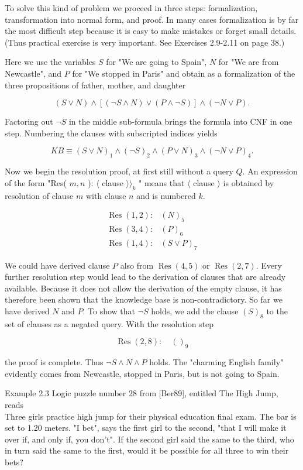 \documentclass[10pt]{article}
\begin{document}
To solve this kind of problem we proceed in three steps: formalization, transformation into normal form, and proof. In many cases formalization is by far the most difficult step because it is easy to make mistakes or forget small details. (Thus practical exercise is very important. See Exercises 2.9-2.11 on page 38.)

Here we use the variables $S$ for "We are going to Spain", $N$ for "We are from Newcastle", and $P$ for "We stopped in Paris" and obtain as a formalization of the three propositions of father, mother, and daughter

$$
(S \vee N) \wedge[(\neg S \wedge N) \vee(P \wedge \neg S)] \wedge(\neg N \vee P) .
$$

Factoring out $\neg S$ in the middle sub-formula brings the formula into CNF in one step. Numbering the clauses with subscripted indices yields

$$
K B \equiv(S \vee N)_{1} \wedge(\neg S)_{2} \wedge(P \vee N)_{3} \wedge(\neg N \vee P)_{4} .
$$

Now we begin the resolution proof, at first still without a query $Q$. An expression of the form "Res( $m, n$ ): $\langle$ clause $\rangle\rangle_{k}$ " means that $\langle$ clause $\rangle$ is obtained by resolution of clause $m$ with clause $n$ and is numbered $k$.

$$
\begin{array}{ll}
\operatorname{Res}(1,2): & (N)_{5} \\
\operatorname{Res}(3,4): & (P)_{6} \\
\operatorname{Res}(1,4): & (S \vee P)_{7}
\end{array}
$$

We could have derived clause $P$ also from $\operatorname{Res}(4,5)$ or $\operatorname{Res}(2,7)$. Every further resolution step would lead to the derivation of clauses that are already available. Because it does not allow the derivation of the empty clause, it has therefore been shown that the knowledge base is non-contradictory. So far we have derived $N$ and $P$. To show that $\neg S$ holds, we add the clause $(S)_{8}$ to the set of clauses as a negated query. With the resolution step

$$
\operatorname{Res}(2,8): \quad()_{9}
$$

the proof is complete. Thus $\neg S \wedge N \wedge P$ holds. The "charming English family" evidently comes from Newcastle, stopped in Paris, but is not going to Spain.

Example 2.3 Logic puzzle number 28 from [Ber89], entitled The High Jump, reads\\
Three girls practice high jump for their physical education final exam. The bar is set to 1.20 meters. "I bet", says the first girl to the second, "that I will make it over if, and only if, you don't". If the second girl said the same to the third, who in turn said the same to the first, would it be possible for all three to win their bets?
\end{document}
